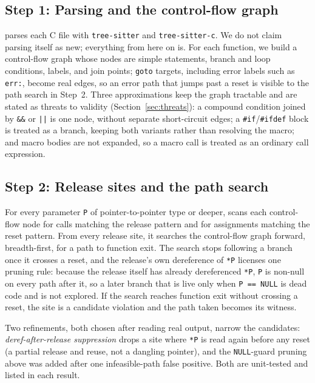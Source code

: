 \subsection{Step 1: Parsing and the control-flow graph}
\label{sec:step1}
\tool parses each C file with \texttt{tree-sitter} and
\texttt{tree-sitter-c}. We do not claim parsing itself as new; everything
from here on is. For each function, we build a control-flow graph whose
nodes are simple statements, branch and loop conditions, labels, and join
points; \texttt{goto} targets, including error labels such as
\texttt{err:}, become real edges, so an error path that jumps past a reset
is visible to the path search in Step~2. Three approximations keep the
graph tractable and are stated as threats to validity
(Section~\ref{sec:threats}): a compound condition joined by \texttt{\&\&}
or \texttt{||} is one node, without separate short-circuit edges; a
\texttt{\#if}/\texttt{\#ifdef} block is treated as a branch, keeping both
variants rather than resolving the macro; and macro bodies are not
expanded, so a macro call is treated as an ordinary call expression.

\subsection{Step 2: Release sites and the path search}
\label{sec:step2}
For every parameter \texttt{P} of pointer-to-pointer type or deeper, \tool
scans each control-flow node for calls matching the release pattern and
for assignments matching the reset pattern. From every release site, it
searches the control-flow graph forward, breadth-first, for a path to
function exit. The search stops following a branch once it crosses a
reset, and the release's own dereference of \texttt{*P} licenses one
pruning rule: because the release itself has already dereferenced
\texttt{*P}, \texttt{P} is non-null on every path after it, so a later
branch that is live only when \texttt{P == NULL} is dead code and is not
explored. If the search reaches function exit without crossing a reset,
the site is a candidate violation and the path taken becomes its witness.

Two refinements, both chosen after reading real output, narrow the
candidates: \emph{deref-after-release suppression} drops a site where
\texttt{*P} is read again before any reset (a partial release and reuse,
not a dangling pointer), and the \texttt{NULL}-guard pruning above was
added after one infeasible-path false positive. Both are unit-tested and
listed in each result.

